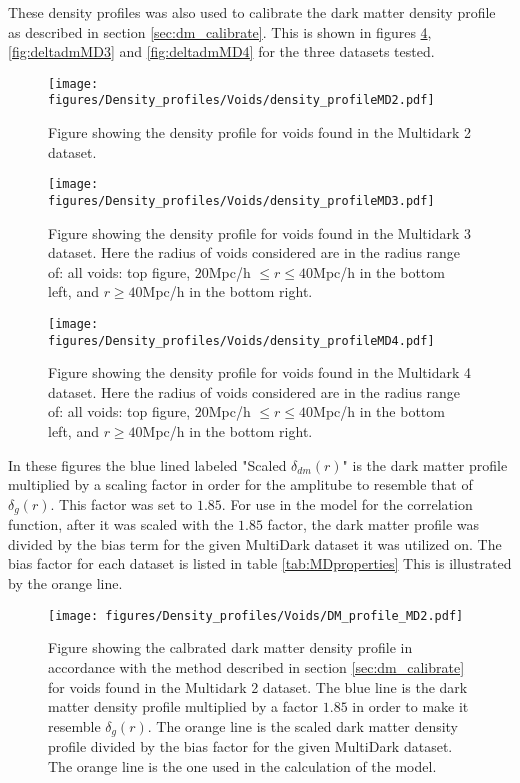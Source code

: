 These density profiles was also used to calibrate the dark matter density profile as described in section \ref{sec:dm_calibrate}. This is shown in figures \ref{fig:deltadmMD2}, \ref{fig:deltadmMD3} and \ref{fig:deltadmMD4} for the three datasets tested.
\begin{figure}[htbp]\label{fig:deltaMD2}
    \texttt{[image: figures/Density\_profiles/Voids/density\_profileMD2.pdf]}
    \caption{Figure showing the density profile for voids found in the Multidark 2 dataset.}
\end{figure}
\begin{figure}[htbp]\label{fig:deltaMD3}
    \texttt{[image: figures/Density\_profiles/Voids/density\_profileMD3.pdf]}
    \caption{Figure showing the density profile for voids found in the Multidark 3 dataset. Here the radius of voids considered are in the radius range of: all voids: top figure, $20$Mpc/h $\leq r\leq 40$Mpc/h in the bottom left, and $r\geq 40$Mpc/h in the bottom right.}
\end{figure}
\begin{figure}[htbp]\label{fig:deltaMD4}
    \texttt{[image: figures/Density\_profiles/Voids/density\_profileMD4.pdf]}
    \caption{Figure showing the density profile for voids found in the Multidark 4 dataset. Here the radius of voids considered are in the radius range of: all voids: top figure, $20$Mpc/h $\leq r\leq 40$Mpc/h in the bottom left, and $r\geq 40$Mpc/h in the bottom right.}
\end{figure}
In these figures the blue lined labeled "Scaled $\delta_{dm}(r)$" is the dark matter profile multiplied by a scaling factor in order for the amplitube to resemble that of $\delta_g(r)$. This factor was set to $1.85$. For use in the model for the correlation function, after it was scaled with the $1.85$ factor, the dark matter profile was divided by the bias term for the given MultiDark dataset it was utilized on. The bias factor for each dataset is listed in table \ref{tab:MDproperties} This is illustrated by the orange line. 
\begin{figure}[htbp]\label{fig:deltadmMD2}
    \texttt{[image: figures/Density\_profiles/Voids/DM\_profile\_MD2.pdf]}
    \caption{Figure showing the calbrated dark matter density profile in accordance with the method described in section \ref{sec:dm_calibrate} for voids found in the Multidark 2 dataset. The blue line is the dark matter density profile multiplied by a factor $1.85$ in order to make it resemble $\delta_g(r)$. The orange line is the scaled dark matter density profile divided by the bias factor for the given MultiDark dataset. The orange line is the one used in the calculation of the model.}
\end{figure}

